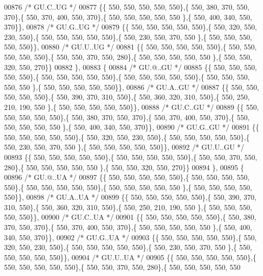 \begin{DoxyCode}
00876 \textcolor{comment}{/* GU.C..UG */}
00877 \{\{ 550, 550, 550, 550, 550\},\{ 550, 380, 370, 550, 370\},\{ 550, 370, 400, 550, 370\},\{ 550, 550, 550, 550, 550
      \},\{ 550, 400, 340, 550, 370\}\},
00878 \textcolor{comment}{/* GU.G..UG */}
00879 \{\{ 550, 550, 550, 550, 550\},\{ 550, 320, 550, 230, 550\},\{ 550, 550, 550, 550, 550\},\{ 550, 230, 550, 370, 550
      \},\{ 550, 550, 550, 550, 550\}\},
00880 \textcolor{comment}{/* GU.U..UG */}
00881 \{\{ 550, 550, 550, 550, 550\},\{ 550, 550, 550, 550, 550\},\{ 550, 550, 370, 550, 280\},\{ 550, 550, 550, 550, 550
      \},\{ 550, 550, 320, 550, 270\}\}
00882 \},
00883 \{
00884 \textcolor{comment}{/* GU.@..GU */}
00885 \{\{ 550, 550, 550, 550, 550\},\{ 550, 550, 550, 550, 550\},\{ 550, 550, 550, 550, 550\},\{ 550, 550, 550, 550, 550
      \},\{ 550, 550, 550, 550, 550\}\},
00886 \textcolor{comment}{/* GU.A..GU */}
00887 \{\{ 550, 550, 550, 550, 550\},\{ 550, 390, 370, 310, 550\},\{ 550, 360, 320, 310, 550\},\{ 550, 250, 210, 190, 550
      \},\{ 550, 550, 550, 550, 550\}\},
00888 \textcolor{comment}{/* GU.C..GU */}
00889 \{\{ 550, 550, 550, 550, 550\},\{ 550, 380, 370, 550, 370\},\{ 550, 370, 400, 550, 370\},\{ 550, 550, 550, 550, 550
      \},\{ 550, 400, 340, 550, 370\}\},
00890 \textcolor{comment}{/* GU.G..GU */}
00891 \{\{ 550, 550, 550, 550, 550\},\{ 550, 320, 550, 230, 550\},\{ 550, 550, 550, 550, 550\},\{ 550, 230, 550, 370, 550
      \},\{ 550, 550, 550, 550, 550\}\},
00892 \textcolor{comment}{/* GU.U..GU */}
00893 \{\{ 550, 550, 550, 550, 550\},\{ 550, 550, 550, 550, 550\},\{ 550, 550, 370, 550, 280\},\{ 550, 550, 550, 550, 550
      \},\{ 550, 550, 320, 550, 270\}\}
00894 \},
00895 \{
00896 \textcolor{comment}{/* GU.@..UA */}
00897 \{\{ 550, 550, 550, 550, 550\},\{ 550, 550, 550, 550, 550\},\{ 550, 550, 550, 550, 550\},\{ 550, 550, 550, 550, 550
      \},\{ 550, 550, 550, 550, 550\}\},
00898 \textcolor{comment}{/* GU.A..UA */}
00899 \{\{ 550, 550, 550, 550, 550\},\{ 550, 390, 370, 310, 550\},\{ 550, 360, 320, 310, 550\},\{ 550, 250, 210, 190, 550
      \},\{ 550, 550, 550, 550, 550\}\},
00900 \textcolor{comment}{/* GU.C..UA */}
00901 \{\{ 550, 550, 550, 550, 550\},\{ 550, 380, 370, 550, 370\},\{ 550, 370, 400, 550, 370\},\{ 550, 550, 550, 550, 550
      \},\{ 550, 400, 340, 550, 370\}\},
00902 \textcolor{comment}{/* GU.G..UA */}
00903 \{\{ 550, 550, 550, 550, 550\},\{ 550, 320, 550, 230, 550\},\{ 550, 550, 550, 550, 550\},\{ 550, 230, 550, 370, 550
      \},\{ 550, 550, 550, 550, 550\}\},
00904 \textcolor{comment}{/* GU.U..UA */}
00905 \{\{ 550, 550, 550, 550, 550\},\{ 550, 550, 550, 550, 550\},\{ 550, 550, 370, 550, 280\},\{ 550, 550, 550, 550, 550

\end{DoxyCode}
